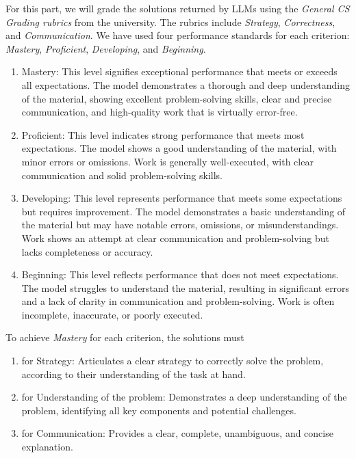 For this part, we will grade the solutions returned by LLMs using the \textit{General CS Grading rubrics} from the university. The rubrics include \textit{Strategy}, \textit{Correctness}, and \textit{Communication}. We have used four performance standards for each criterion:  \textit{Mastery},  \textit{Proficient}, \textit{Developing}, and \textit{Beginning}. 



\begin{enumerate}
	\item Mastery: This level signifies exceptional performance that meets or exceeds all
	expectations. The model demonstrates a thorough and deep understanding of the
	material, showing excellent problem-solving skills, clear and precise communication, and
	high-quality work that is virtually error-free.
	
	\item Proficient: This level indicates strong performance that meets most expectations. The
	model shows a good understanding of the material, with minor errors or omissions. Work
	is generally well-executed, with clear communication and solid problem-solving skills.
	
	\item Developing: This level represents performance that meets some expectations but requires improvement. The model demonstrates a basic understanding of the material but may have notable errors, omissions, or misunderstandings. Work shows an attempt at clear communication and problem-solving but lacks completeness or accuracy.
	
	\item Beginning: This level reflects performance that does not meet expectations. The model struggles to understand the material, resulting in significant errors and a lack of clarity in communication and problem-solving. Work is often incomplete, inaccurate, or poorly executed.
\end{enumerate}



To achieve \textit{Mastery} for each criterion, the solutions must


\begin{enumerate}
    \item for Strategy: Articulates a clear strategy to correctly solve the problem, according to their understanding of the task at hand.
    \item for Understanding of the problem: Demonstrates a deep understanding of the problem, identifying all key components and potential challenges.
    \item for Communication: Provides a clear, complete, unambiguous, and concise explanation.
\end{enumerate}

